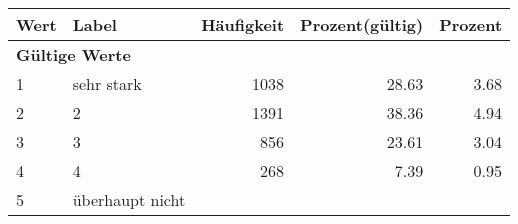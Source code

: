      \begin{longtable}{lXrrr}
     \toprule
     \textbf{Wert} & \textbf{Label} & \textbf{Häufigkeit} & \textbf{Prozent(gültig)} & \textbf{Prozent} \\
     \endhead
     \midrule
     \multicolumn{5}{l}{\textbf{Gültige Werte}}\\

     1 &
     \multicolumn{1}{X}{ sehr stark   } &


       \num{1038} &
       \num[round-mode=places,round-precision=2]{28.63} &
         \num[round-mode=places,round-precision=2]{3.68} \\

     2 &
     \multicolumn{1}{X}{ 2   } &


       \num{1391} &
       \num[round-mode=places,round-precision=2]{38.36} &
         \num[round-mode=places,round-precision=2]{4.94} \\

     3 &
     \multicolumn{1}{X}{ 3   } &


       \num{856} &
       \num[round-mode=places,round-precision=2]{23.61} &
         \num[round-mode=places,round-precision=2]{3.04} \\

     4 &
     \multicolumn{1}{X}{ 4   } &


       \num{268} &
       \num[round-mode=places,round-precision=2]{7.39} &
         \num[round-mode=places,round-precision=2]{0.95} \\

     5 &
     \multicolumn{1}{X}{ überhaupt nicht   } &



\end{longtable}
